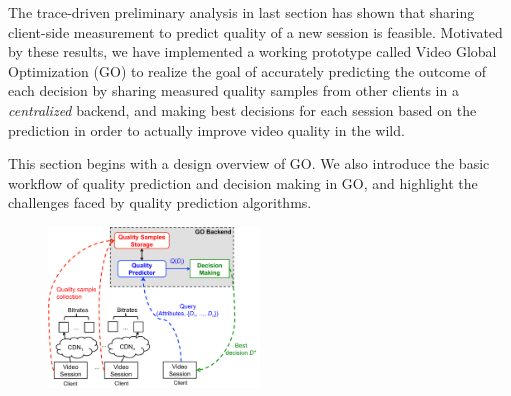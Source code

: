 

 The trace-driven preliminary analysis in last section has shown that sharing client-side measurement to predict quality of a new session is feasible. Motivated by these results, we have implemented a working prototype called Video Global Optimization (GO) to realize the goal of accurately predicting the outcome of each decision by sharing measured quality samples from other clients in a {\it centralized} backend, and making best decisions for each session based on the prediction in order to actually improve video quality in the wild.

 This section begins with a design overview of GO. We also introduce the basic workflow of quality prediction and decision making in GO, and highlight the challenges faced by quality prediction algorithms. 




\begin{figure}[h!]
\centering
 \includegraphics[width=0.5\textwidth] {figures/go-overview.pdf}
\label{fig:go-overview}
\end{figure}

